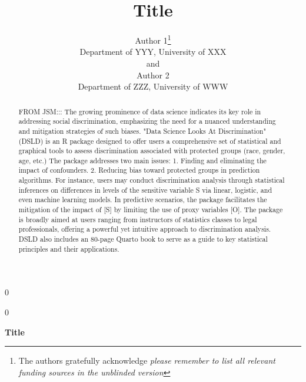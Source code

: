 \documentclass[12pt]{article}
\newcommand{\blind}{0}
\begin{document}
%

\def\spacingset#1{\renewcommand{\baselinestretch}%
{#1}\small\normalsize} \spacingset{1}



\blind
{
  \title{\bf Title}
  \author{Author 1\thanks{
    The authors gratefully acknowledge \textit{please remember to list all relevant funding sources in the unblinded version}}\hspace{.2cm}\\
    Department of YYY, University of XXX\\
    and \\
    Author 2 \\
    Department of ZZZ, University of WWW}
  \maketitle
} \fi

\blind
{
  \bigskip
  \bigskip
  \bigskip
  \begin{center}
    {\LARGE\bf Title}
\end{center}
  \medskip
} \fi

\bigskip
\begin{abstract}
FROM JSM::: The growing prominence of data science indicates its key role in addressing social discrimination, emphasizing the need for a nuanced understanding and mitigation strategies of such biases. "Data Science Looks At Discrimination" (DSLD) is an R package designed to offer users a comprehensive set of statistical and graphical tools to assess discrimination associated with protected groups (race, gender, age, etc.) The package addresses two main issues: 1. Finding and eliminating the impact of confounders. 2. Reducing bias toward protected groups in prediction algorithms. For instance, users may conduct discrimination analysis through statistical inferences on differences in levels of the sensitive variable S via linear, logistic, and even machine learning models. In predictive scenarios, the package facilitates the mitigation of the impact of [S] by limiting the use of proxy variables [O]. The package is broadly aimed at users ranging from instructors of statistics classes to legal professionals, offering a powerful yet intuitive approach to discrimination analysis. DSLD also includes an 80-page Quarto book to serve as a guide to key statistical principles and their applications.
\end{abstract}
\end{document}
